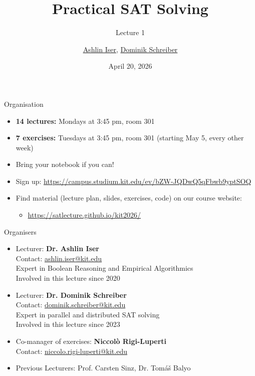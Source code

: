 \documentclass[t]{sdqbeamer}
\title{Practical SAT Solving}
\subtitle{Lecture 1 \unimp{\normalfont --  Organization, Introduction, Incremental SAT Solving}}
\author{\underline{Ashlin Iser}, \underline{Dominik Schreiber}}
\date{April 20, 2026}
\begin{document}
\begin{frame}[title white horizontal, picture=logos/blender-render, kitlogo=rgb]
	\titlepage
\end{frame}

\begin{frame}{Organisation}
	\begin{itemize}\setlength{\itemsep}{1em}
		\item \textbf{14 lectures:} Mondays at 3:45 pm, room 301
		\item \textbf{7 exercises:} Tuesdays at 3:45 pm, room 301 (starting May 5, every other week)
		\item Bring your notebook if you can!
		\item Sign up: \url{https://campus.studium.kit.edu/ev/bZW-JQDwQ5qFbwb9yptSOQ}
		\item Find material (lecture plan, slides, exercises, code) on our course website:
		\begin{itemize}
			\item \large\url{https://satlecture.github.io/kit2026/}
		\end{itemize}
	\end{itemize}
\end{frame}

\begin{frame}{Organisers}
	\begin{itemize}\setlength{\itemsep}{1em}
		\item Lecturer: \textbf{Dr. Ashlin Iser} \hfill{}\\
		Contact: \href{mailto:ashlin.iser@kit.edu}{ashlin.iser@kit.edu}\\[1ex]
		Expert in Boolean Reasoning and Empirical Algorithmics\\[1ex]
		Involved in this lecture since 2020 \\[1ex]
		\item Lecturer: \textbf{Dr. Dominik Schreiber} \hfill{}\\
		Contact: \href{mailto:dominik.schreiber@kit.edu}{dominik.schreiber@kit.edu}\\[1ex]
		Expert in {parallel and distributed} SAT solving\\[1ex]
		Involved in this lecture since 2023 \\[1ex]
		\item Co-manager of exercises: \textbf{Niccolò Rigi-Luperti} \hfill{}\\
		Contact: \href{mailto:niccolo.rigi-luperti@kit.edu}{niccolo.rigi-luperti@kit.edu}\\[1ex]
		\item {Previous Lecturers}: {Prof. Carsten Sinz}, {Dr. Tom\'a\v{s} Balyo}\\
	\end{itemize}
\end{frame}
\end{document}
